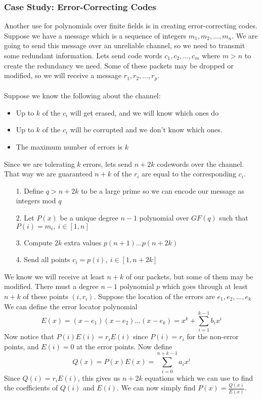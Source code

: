 \documentclass{article}
\begin{document}
\subsubsection{Case Study: Error-Correcting Codes}
Another use for polynomials over finite fields is in creating error-correcting codes.
Suppose we have a message which is a sequence of integers $m_1, m_2, ..., m_n$.
We are going to send this message over an unreliable channel, so we need to transmit some redundant information.
Lets send code words $c_1, c_2, ..., c_m$ where $m>n$ to create the redundancy we need. Some of these packets may be dropped
or modified, so we will receive a message $r_1, r_2,..., r_p$.\\\\
Suppose we know the following about the channel:
\begin{itemize}
    \item Up to $k$ of the $c_i$ will get erased, and we will know which ones do
    \item Up to $k$ of the $c_i$ will be corrupted and we don't know which ones.
    \item The maximum number of errors is $k$
\end{itemize}
Since we are tolerating $k$ errors, lets send $n+2k$ codewords over the channel. That way we
are guaranteed $n+k$ of the $r_i$ are equal to the corresponding $c_i$.
\begin{itemize}
    \item[1.] Define $q > n + 2k$ to be a large prime so we can encode our message as integers mod $q$
    \item[2.] Let $P(x)$ be a unique degree $n-1$ polynomial over $GF(q)$ such that $P(i)=m_i,\ i\in[1, n]$
    \item[3.] Compute $2k$ extra values $p(n+1)...p(n+2k)$
    \item[4.] Send all points $c_i=p(i),\ i\in[1, n+2k]$    
\end{itemize}
We know we will receive at least $n+k$ of our packets, but some of them may be modified. There must a degree $n-1$ polynomial $p$
which goes through at least $n+k$ of these points $(i, r_i)$. Suppose the location of the errors are ${e_1, e_2, ..., e_k}$
We can define the error locator polynomial $$E(x) = (x-e_1)(x-e_2)...(x-e_k) = x^k+\sum_{i=1}^{k-1}{b_ix^i}$$
Now notice that $P(i)E(i)=r_iE(i)$ since $P(i) = r_i$ for the non-error points, and $E(i)=0$ at the error points.
Now define
$$Q(x) = P(x)E(x) = \sum_{i=0}^{n+k-1}{a_ix^i}$$
Since $Q(i) = r_iE(i)$, this gives us $n+2k$ equations which we can use to find the coefficients of
$Q(i)$ and $E(i)$. We can now simply find $P(x) = \frac{Q(x)}{E(x)}$. 
\end{document}
